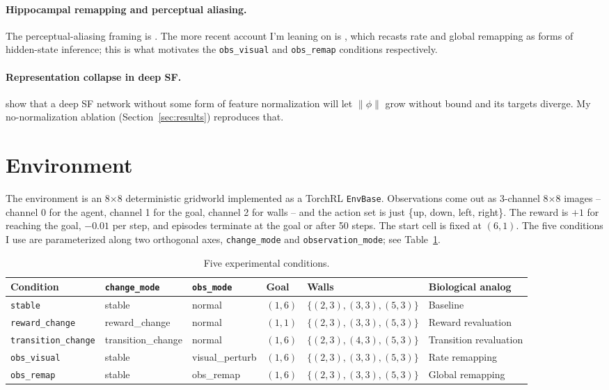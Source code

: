 \documentclass{article}
\begin{document}
\paragraph{Hippocampal remapping and perceptual aliasing.} The perceptual-aliasing framing is \citet{whitehead1992aliasing}. The more recent account I'm leaning on is \citet{sanders2020remap}, which recasts rate and global remapping as forms of hidden-state inference; this is what motivates the \texttt{obs\_visual} and \texttt{obs\_remap} conditions respectively.

\paragraph{Representation collapse in deep SF.} \citet{lehnert2024sf} show that a deep SF network without some form of feature normalization will let $\|\phi\|$ grow without bound and its targets diverge. My no-normalization ablation (Section~\ref{sec:results}) reproduces that.

\section{Environment}
\label{sec:env}

The environment is an 8$\times$8 deterministic gridworld implemented as a TorchRL \texttt{EnvBase}. Observations come out as 3-channel 8$\times$8 images -- channel 0 for the agent, channel 1 for the goal, channel 2 for walls -- and the action set is just \{up, down, left, right\}. The reward is $+1$ for reaching the goal, $-0.01$ per step, and episodes terminate at the goal or after 50 steps. The start cell is fixed at $(6,1)$. The five conditions I use are parameterized along two orthogonal axes, \texttt{change\_mode} and \texttt{observation\_mode}; see Table~\ref{tab:conditions}.

\begin{table}[h]
\centering
\small
\caption{Five experimental conditions.}
\label{tab:conditions}
\begin{tabular}{@{}l l l l l l@{}}
\toprule
Condition & \texttt{change\_mode} & \texttt{obs\_mode} & Goal & Walls & Biological analog \\
\midrule
\texttt{stable} & stable & normal & $(1,6)$ & $\{(2,3),(3,3),(5,3)\}$ & Baseline \\
\texttt{reward\_change} & reward\_change & normal & $(1,1)$ & $\{(2,3),(3,3),(5,3)\}$ & Reward revaluation \\
\texttt{transition\_change} & transition\_change & normal & $(1,6)$ & $\{(2,3),(4,3),(5,3)\}$ & Transition revaluation \\
\texttt{obs\_visual} & stable & visual\_perturb & $(1,6)$ & $\{(2,3),(3,3),(5,3)\}$ & Rate remapping \\
\texttt{obs\_remap} & stable & obs\_remap & $(1,6)$ & $\{(2,3),(3,3),(5,3)\}$ & Global remapping \\
\bottomrule
\end{tabular}
\end{table}
\end{document}
